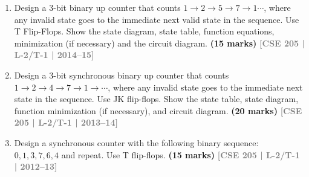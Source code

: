 \documentclass[12pt]{article}
\newcommand{\yr}[1]{\hfill\textcolor{gray}{\small\textbf{[#1]}}}
\newcommand{\mk}[1]{\textcolor{orange!70!black}{\small\textbf{(#1 marks)}}}
\begin{document}
\begin{enumerate}
\begin{center}
\end{center}

\mk{12} \yr{CSE 205 | L-2/T-1 | 2015--16}

\item Design a 3-bit binary up counter that counts $1 \to 2 \to 5 \to 7 \to 1\cdots$, where any invalid state goes to the immediate next valid state in the sequence. Use T Flip-Flops. Show the state diagram, state table, function equations, minimization (if necessary) and the circuit diagram.
\mk{15} \yr{CSE 205 | L-2/T-1 | 2014--15}

\item Design a 3-bit synchronous binary up counter that counts $1 \to 2 \to 4 \to 7 \to 1 \to \cdots$, where any invalid state goes to the immediate next state in the sequence. Use JK flip-flops. Show the state table, state diagram, function minimization (if necessary), and circuit diagram.
\mk{20} \yr{CSE 205 | L-2/T-1 | 2013--14}

\item Design a synchronous counter with the following binary sequence: $0, 1, 3, 7, 6, 4$ and repeat. Use T flip-flops.
\mk{15} \yr{CSE 205 | L-2/T-1 | 2012--13}

\end{enumerate}
\end{document}
